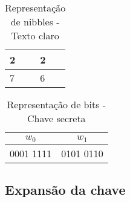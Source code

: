 \documentclass[
    article,            %
    11pt,               %
    oneside,            %
    a4paper,            %
    english,            %
    brazil,             %
    sumario=tradicional,
    ]{abntex2}
\begin{document}
\begin{table}[H]
\centering
\caption{Representação de nibbles - Texto claro}
\label{input-data-nibbles}
\begin{tabular}{|l|l|}
\hline
2 & 2 \\ \hline
7 & 6 \\ \hline
\end{tabular}
\end{table}

\begin{table}[H]
\centering
\caption{Representação de bits - Chave secreta}
\label{input-key-bits}
\begin{tabular}{|c|c|}
\hline
$w_0$ & $w_1$ \\ \hline
0001 1111 & 0101 0110 \\ \hline
\end{tabular}
\end{table}

\subsection{\textbf{Expansão da chave}}
\end{document}
